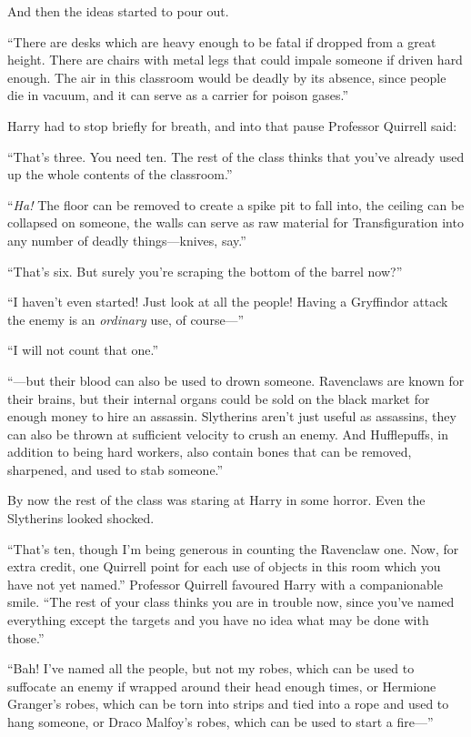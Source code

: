 And then the ideas started to pour out.

“There are desks which are heavy enough to be fatal if dropped from a great height. There are chairs with metal legs that could impale someone if driven hard enough. The air in this classroom would be deadly by its absence, since people die in vacuum, and it can serve as a carrier for poison gases.”

Harry had to stop briefly for breath, and into that pause Professor Quirrell said:

“That’s three. You need ten. The rest of the class thinks that you’ve already used up the whole contents of the classroom.”

“\emph{Ha!} The floor can be removed to create a spike pit to fall into, the ceiling can be collapsed on someone, the walls can serve as raw material for Transfiguration into any number of deadly things—knives, say.”

“That’s six. But surely you’re scraping the bottom of the barrel now?”

“I haven’t even started! Just look at all the people! Having a Gryffindor attack the enemy is an \emph{ordinary} use, of course—”

“I will not count that one.”

“—but their blood can also be used to drown someone. Ravenclaws are known for their brains, but their internal organs could be sold on the black market for enough money to hire an assassin. Slytherins aren’t just useful as assassins, they can also be thrown at sufficient velocity to crush an enemy. And Hufflepuffs, in addition to being hard workers, also contain bones that can be removed, sharpened, and used to stab someone.”

By now the rest of the class was staring at Harry in some horror. Even the Slytherins looked shocked.

“That’s ten, though I’m being generous in counting the Ravenclaw one. Now, for extra credit, one Quirrell point for each use of objects in this room which you have not yet named.” Professor Quirrell favoured Harry with a companionable smile. “The rest of your class thinks you are in trouble now, since you’ve named everything except the targets and you have no idea what may be done with those.”

“Bah! I’ve named all the people, but not my robes, which can be used to suffocate an enemy if wrapped around their head enough times, or Hermione Granger’s robes, which can be torn into strips and tied into a rope and used to hang someone, or Draco Malfoy’s robes, which can be used to start a fire—”

